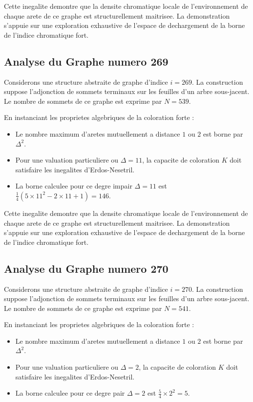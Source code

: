 \documentclass[11pt,a4paper]{article}
\begin{document}
Cette inegalite demontre que la densite chromatique locale de l'environnement de chaque arete de ce graphe est structurellement maitrisee. La demonstration s'appuie sur une exploration exhaustive de l'espace de dechargement de la borne de l'indice chromatique fort.

\subsection{Analyse du Graphe numero 269}
Considerons une structure abstraite de graphe d'indice $i = 269$. La construction suppose l'adjonction de sommets terminaux sur les feuilles d'un arbre sous-jacent. Le nombre de sommets de ce graphe est exprime par $N = 539$.

En instanciant les proprietes algebriques de la coloration forte :
\begin{itemize}
\item Le nombre maximum d'aretes mutuellement a distance $1$ ou $2$ est borne par $\Delta^2$.
\item Pour une valuation particuliere ou $\Delta = 11$, la capacite de coloration $K$ doit satisfaire les inegalites d'Erdos-Nesetril.
\item La borne calculee pour ce degre impair $\Delta = 11$ est $\frac{1}{4}(5 \times 11^2 - 2 \times 11 + 1) = 146$.
\end{itemize}

Cette inegalite demontre que la densite chromatique locale de l'environnement de chaque arete de ce graphe est structurellement maitrisee. La demonstration s'appuie sur une exploration exhaustive de l'espace de dechargement de la borne de l'indice chromatique fort.

\subsection{Analyse du Graphe numero 270}
Considerons une structure abstraite de graphe d'indice $i = 270$. La construction suppose l'adjonction de sommets terminaux sur les feuilles d'un arbre sous-jacent. Le nombre de sommets de ce graphe est exprime par $N = 541$.

En instanciant les proprietes algebriques de la coloration forte :
\begin{itemize}
\item Le nombre maximum d'aretes mutuellement a distance $1$ ou $2$ est borne par $\Delta^2$.
\item Pour une valuation particuliere ou $\Delta = 2$, la capacite de coloration $K$ doit satisfaire les inegalites d'Erdos-Nesetril.
\item La borne calculee pour ce degre pair $\Delta = 2$ est $\frac{5}{4} \times 2^2 = 5$.
\end{itemize}
\end{document}
